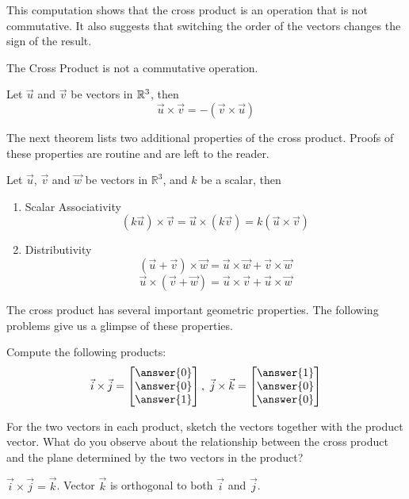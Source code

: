 \documentclass{ximera}
\begin{document}
\begin{exploration}
This computation shows that the cross product is an operation that is not commutative. It also suggests that switching the order of the vectors changes the sign of the result.
\end{exploration}
 
\begin{warning}The Cross Product is not a commutative operation.
\end{warning}
 
\begin{theorem}\label{th:corssuvnegcrossvu}
Let $\vec{u}$ and $\vec{v}$ be vectors in $\mathbb{R}^3$, then
$$\vec{u}\times\vec{v}=-(\vec{v}\times\vec{u})$$
\end{theorem}

The next theorem lists two additional properties of the cross product.  Proofs of these properties are routine and are left to the reader.
\begin{theorem}\label{th:crossproductproperties}
Let $\vec{u}$, $\vec{v}$ and $\vec{w}$ be vectors in $\mathbb{R}^3$, and $k$ be a scalar, then\\
\begin{enumerate}
\item\label{item:scalarassocofcrossprod} Scalar Associativity
$$(k\vec{u})\times \vec{v}=\vec{u}\times (k\vec{v})=k(\vec{u}\times \vec{v})$$
\item\label{item:distofrossprod} Distributivity
$$(\vec{u}+\vec{v})\times \vec{w}=\vec{u}\times \vec{w}+\vec{v}\times \vec{w}$$
$$\vec{u}\times (\vec{v}+\vec{w})=\vec{u}\times \vec{v}+\vec{u}\times \vec{w}$$
\end{enumerate}
\end{theorem}
 
The cross product has several important geometric properties. The following problems give us a glimpse of these properties.
 
\begin{exploration}\label{init:ijkcrossproducts}
Compute the following products:
$$\vec{i}\times\vec{j}=\begin{bmatrix}\answer{0}\\\answer{0}\\\answer{1}\end{bmatrix},\quad\vec{j}\times\vec{k}=\begin{bmatrix}\answer{1}\\\answer{0}\\\answer{0}\end{bmatrix}$$
 
For the two vectors in each product, sketch the vectors together with the product vector.  What do you observe about the relationship between the cross product and the plane determined by the two vectors in the product? 
\begin{hint}
$\vec{i}\times\vec{j}=\vec{k}$.  Vector $\vec{k}$ is orthogonal to both $\vec{i}$ and $\vec{j}$. 
\end{hint}
 
 
 
\end{exploration}
 
\end{document}
